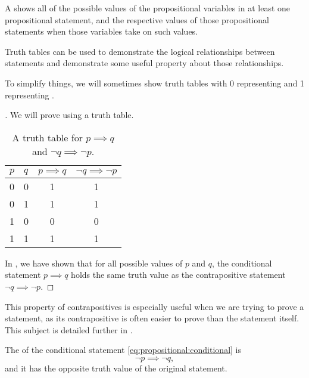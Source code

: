 \begin{defn}
  A  shows all of the possible values
  of the propositional variables in at least one propositional statement,
  and the respective values of those propositional statements when those
  variables take on such values.

  Truth tables can be used to demonstrate the logical relationships between
  statements and demonstrate some useful property about those relationships.

  To simplify things, we will sometimes show truth tables with 0 representing
  \lfalse{} and 1 representing \ltrue{}.
\end{defn}

\begin{proof}[]
  We will prove  using a truth table.
  \begin{table}[H]
    \centering
    \begin{tabular}{llcc}
      \toprule
      $p$ & $q$ & $p\implies q$ & $\neg q \implies \neg p$\\
      \midrule
      0 & 0 & 1 & 1 \\
      0 & 1 & 1 & 1 \\
      1 & 0 & 0 & 0 \\
      1 & 1 & 1 & 1 \\
      \bottomrule
    \end{tabular}
    \caption{A truth table for $p\implies q$ and $\neg q \implies \neg p$.}
    \label{tab:contrapositive}
  \end{table}
  In , we have shown that for all
  possible values of $p$ and $q$,
  the conditional statement $p \implies q$
  holds the same truth value as the contrapositive statement
  $\neg q \implies \neg p$.
\end{proof}

This property of contrapositives is especially useful when we are trying to prove a statement,
as its contrapositive is often easier to prove than the statement itself.
This subject is detailed further in .

\begin{defn}[inverse]
  The  of
  the conditional statement
  \eqref{eq:propositional:conditional}
  is
  \begin{equation}
    \neg p \implies \neg q,
    \label{eq:propositional:inverse}
  \end{equation}
  and it has the opposite truth value of the original statement.
\end{defn}


